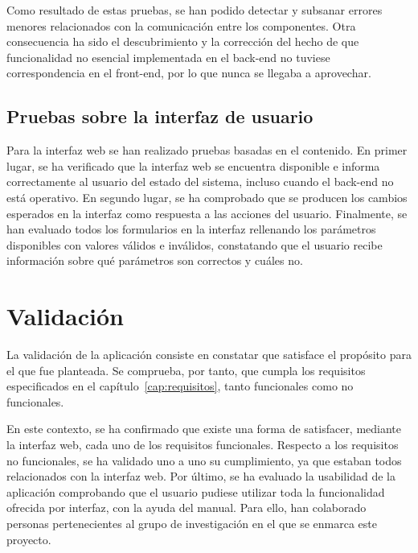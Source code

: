 Como resultado de estas pruebas, se han podido detectar y subsanar errores menores relacionados con la comunicación entre los componentes.
Otra consecuencia ha sido el descubrimiento y la corrección del hecho de que funcionalidad no esencial implementada en el \gls{back-end} no tuviese correspondencia en el \gls{front-end}, por lo que nunca se llegaba a aprovechar.

\subsection*{Pruebas sobre la interfaz de usuario\label{ssec:pb:interfaz}}

Para la interfaz web se han realizado pruebas basadas en el contenido.
En primer lugar, se ha verificado que la interfaz web se encuentra disponible e informa correctamente al usuario del estado del sistema, incluso cuando el \gls{back-end} no está operativo.
En segundo lugar, se ha comprobado que se producen los cambios esperados en la interfaz como respuesta a las acciones del usuario.
Finalmente, se han evaluado todos los formularios en la interfaz rellenando los parámetros disponibles con valores válidos e inválidos, constatando que el usuario recibe información sobre qué parámetros son correctos y cuáles no.

\section{Validación\label{sec:pb:validacion}}

La validación de la aplicación consiste en constatar que satisface el propósito para el que fue planteada.
Se comprueba, por tanto, que cumpla los requisitos especificados en el capítulo~\ref{cap:requisitos}, tanto funcionales como no funcionales.

En este contexto, se ha confirmado que existe una forma de satisfacer, mediante la interfaz web, cada uno de los requisitos funcionales.
Respecto a los requisitos no funcionales, se ha validado uno a uno su cumplimiento, ya que estaban todos relacionados con la interfaz web.
Por último, se ha evaluado la usabilidad de la aplicación comprobando que el usuario pudiese utilizar toda la funcionalidad ofrecida por interfaz, con la ayuda del manual.
Para ello, han colaborado personas pertenecientes al grupo de investigación en el que se enmarca este proyecto.

